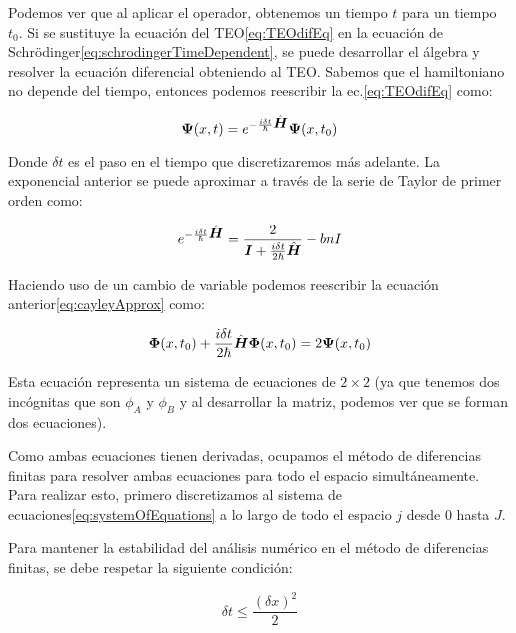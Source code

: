 \noindent Podemos ver que al aplicar el operador, obtenemos un tiempo $t$ para un tiempo $t_0$.
Si se sustituye la ecuación del TEO\eqref{eq:TEOdifEq} en la ecuación de Schrödinger\eqref{eq:schrodingerTimeDependent}, se puede desarrollar el álgebra y resolver la ecuación diferencial obteniendo al TEO\@.
Sabemos que el hamiltoniano no depende del tiempo, entonces podemos reescribir la ec.\eqref{eq:TEOdifEq} como:

\begin{equation}
    \label{eq:TEOApplied}
    \mbox{\boldmath $\Psi$}(x,t)= e^{-\frac{i\delta t}{\hbar}\hat{\mbox{\boldmath $H$}}} \mbox{\boldmath $\Psi$}(x,t_0)
\end{equation}

\noindent Donde $\delta t$ es el paso en el tiempo que discretizaremos más adelante.
La exponencial anterior se puede aproximar a través de la serie de Taylor de primer orden como:

\begin{equation}
    \label{eq:cayleyApprox}
    e^{-\frac{i\delta t}{\hbar}\hat{\mbox{\boldmath $H$}}} = \frac{2}{\mbox{\boldmath $I$} + \frac{i\delta t}{2\hbar}\hat{\mbox{\boldmath $H$}}}-bn{I}
\end{equation}

Haciendo uso de un cambio de variable podemos reescribir la ecuación anterior\eqref{eq:cayleyApprox} como:

\begin{equation}
    \label{eq:systemOfEquations}
    \mbox{\boldmath $\Phi$}(x,t_0) + \frac{i\delta t}{2\hbar}\hat{\mbox{\boldmath $H$}}\mbox{\boldmath $\Phi$}(x,t_0)=2\mbox{\boldmath $\Psi$}(x,t_0)
\end{equation}

\noindent Esta ecuación representa un sistema de ecuaciones de $2\times2$ (ya que tenemos dos incógnitas que son $\phi_A$ y $\phi_B$ y al desarrollar la matriz, podemos ver que se forman dos ecuaciones).

Como ambas ecuaciones tienen derivadas, ocupamos el método de diferencias finitas para resolver ambas ecuaciones para todo el espacio simultáneamente.
Para realizar esto, primero discretizamos al sistema de ecuaciones\eqref{eq:systemOfEquations} a lo largo de todo el espacio $j$ desde $0$ hasta $J$.

Para mantener la estabilidad del análisis numérico en el método de diferencias finitas, se debe respetar la siguiente condición\cite{Carrillo2015}:

\begin{equation}
    \label{eq:stabilityCondition}
    \delta t \leq \frac{\left( \delta x \right)^2}{2}
\end{equation}

